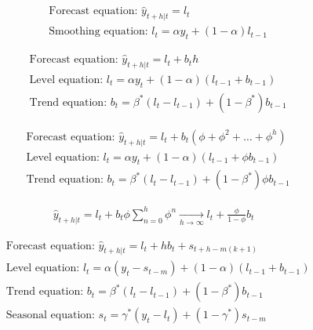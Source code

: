 \documentclass[12pt]{article}
\begin{document}
\begin{align*}
	&\text{Forecast equation: } \hat{y}_{t+h|t} = l_t \\
	&\text{Smoothing equation: } l_t = \alpha y_t + (1-\alpha) l_{t-1}
\end{align*}

\begin{align*}
	&\text{Forecast equation: } \hat{y}_{t+h|t} = l_t + b_t h\\
	&\text{Level equation: } l_t = \alpha y_t + (1-\alpha) (l_{t-1} + b_{t-1}) \\
	&\text{Trend equation: } b_t = \beta^*(l_t - l_{t-1}) + (1-\beta^*) b_{t-1}
\end{align*}

\begin{align*}
	&\text{Forecast equation: } \hat{y}_{t+h|t} = l_t + b_t (\phi + \phi^2 + \ldots + \phi^h)\\
	&\text{Level equation: } l_t = \alpha y_t + (1-\alpha) (l_{t-1} + \phi b_{t-1}) \\
	&\text{Trend equation: } b_t = \beta^*(l_t - l_{t-1}) + (1-\beta^*) \phi b_{t-1}
\end{align*}

\begin{align*}
	\hat{y}_{t+h|t} = l_t + b_t \phi \sum_{n=0}^h \phi^n \underset{h\rightarrow \infty}{\longrightarrow} l_t + \frac{\phi}{1-\phi} b_t
\end{align*}


\begin{align*}
	&\text{Forecast equation: } \hat{y}_{t+h|t} = l_t + h b_t + s_{t+h-m(k+1)} \\
	&\text{Level equation: } l_t = \alpha (y_t - s_{t-m}) + (1-\alpha) (l_{t-1} + b_{t-1}) \\
	&\text{Trend equation: } b_t = \beta^*(l_t - l_{t-1}) + (1-\beta^*) b_{t-1} \\
	&\text{Seasonal equation: } s_t = \gamma^*(y_t - l_t) + (1-\gamma^*) s_{t-m}
\end{align*}
\end{document}

